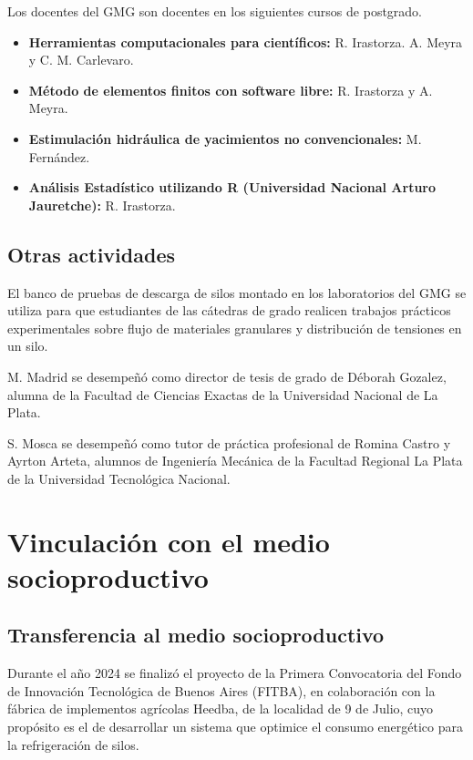 \documentclass[a4paper,11pt,twoside,final,titlepage,onecolumn,openright]{report}
\begin{document}
Los docentes del GMG son docentes en los siguientes cursos de postgrado.

\begin{itemize}
 \item {\bf Herramientas computacionales para científicos:} R. Irastorza. A. Meyra y C. M. Carlevaro.
 \item \textbf{Método de elementos finitos con software libre:} R. Irastorza y A. Meyra.
 \item \textbf{Estimulación hidráulica de yacimientos no convencionales:} M. Fernández.
 \item {\bf Análisis Estadístico utilizando R (Universidad Nacional Arturo Jauretche):} R. Irastorza.
\end{itemize}

\section{Otras actividades}

El banco de pruebas de descarga de silos montado en los laboratorios del GMG se utiliza para que estudiantes de las cátedras de grado realicen trabajos prácticos experimentales sobre flujo de materiales granulares y distribución de tensiones en un silo. 

M. Madrid se desempeñó como director de tesis de grado de Déborah Gozalez, alumna de la Facultad de Ciencias Exactas de la Universidad Nacional de La Plata.

S. Mosca se desempeñó como tutor de práctica profesional de Romina Castro y Ayrton Arteta, alumnos de Ingeniería Mecánica de la Facultad Regional La Plata de la Universidad Tecnológica Nacional.

\chapter{Vinculación con el medio socioproductivo}

\section{Transferencia al medio socioproductivo}

Durante el año 2024 se finalizó el proyecto de la Primera Convocatoria del Fondo de Innovación Tecnológica de Buenos Aires (FITBA), en colaboración con la fábrica de implementos agrícolas Heedba, de la localidad de 9 de Julio, cuyo propósito es el de desarrollar un sistema que optimice el consumo energético para la refrigeración de silos. 
\end{document}
